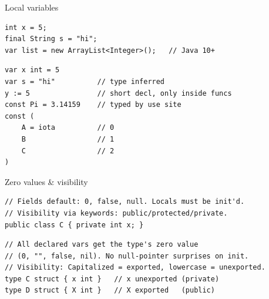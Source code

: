 \documentclass[10pt]{article}
\begin{document}

\begin{construct}{Local variables}
\noindent
\begin{minipage}[t]{0.485\linewidth}
\begin{lstlisting}[style=java, title=Java]
int x = 5;
final String s = "hi";
var list = new ArrayList<Integer>();   // Java 10+
\end{lstlisting}
\end{minipage}\hfill
\begin{minipage}[t]{0.485\linewidth}
\begin{lstlisting}[style=go, title=Go]
var x int = 5
var s = "hi"          // type inferred
y := 5                // short decl, only inside funcs
const Pi = 3.14159    // typed by use site
const (
    A = iota          // 0
    B                 // 1
    C                 // 2
)
\end{lstlisting}
\end{minipage}
\end{construct}

\begin{construct}{Zero values \& visibility}
\noindent
\begin{minipage}[t]{0.485\linewidth}
\begin{lstlisting}[style=java, title=Java]
// Fields default: 0, false, null. Locals must be init'd.
// Visibility via keywords: public/protected/private.
public class C { private int x; }
\end{lstlisting}
\end{minipage}\hfill
\begin{minipage}[t]{0.485\linewidth}
\begin{lstlisting}[style=go, title=Go]
// All declared vars get the type's zero value
// (0, "", false, nil). No null-pointer surprises on init.
// Visibility: Capitalized = exported, lowercase = unexported.
type C struct { x int }   // x unexported (private)
type D struct { X int }   // X exported   (public)
\end{lstlisting}
\end{minipage}
\end{construct}

\end{document}
